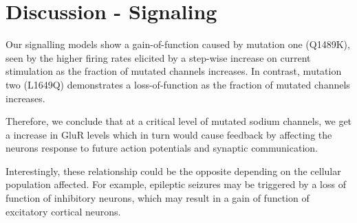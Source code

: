 \section{Discussion - Signaling}
Our signalling models show a gain-of-function caused by mutation one (Q1489K), seen by the higher
firing rates elicited by a step-wise increase on current stimulation as the fraction of mutated
channels increases. In contrast, mutation two (L1649Q) demonstrates a loss-of-function as the
fraction of mutated channels increases.

Therefore, we conclude that at a critical level of mutated sodium channels, we get a increase in
GluR levels which in turn would cause feedback by affecting the neurons response to future action
potentials and synaptic communication.

Interestingly, these relationship could be the opposite depending on the cellular
population affected. For example, epileptic seizures may be triggered by a loss of function of
inhibitory neurons, which may result in a gain of function of excitatory cortical neurons.
